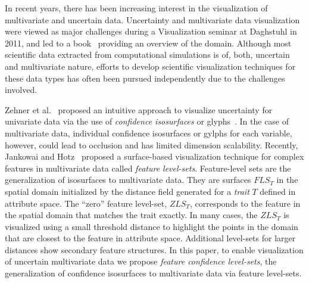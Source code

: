 In recent years, there has been increasing interest in the visualization of multivariate and uncertain data.
%
Uncertainty and multivariate data visualization were viewed as major challenges during a Visualization seminar at Daghstuhl in 2011, and led to a book~\cite{hansen2014scientific} providing an overview of the domain. 
%
Although most scientific data extracted from computational simulations is of, both, uncertain and multivariate nature, efforts to develop scientific visualization techniques for these data types has often been pursued independently due to the challenges involved.
%

Zehner et al.~\cite{zehner2010visualization} proposed an intuitive approach to visualize uncertainty for univariate data via the use of \textit{confidence isosurfaces} or glyphs~\cite{zehner2010visualization}.
%
In the case of multivariate data, individual confidence isosurfaces or gylphs for each variable, however, could lead to occlusion and has limited dimension scalability.
%
Recently, Jankowai and Hotz~\cite{jankowai2020feature} proposed a surface-based visualization technique for complex features in multivariate data called \textit{feature level-sets}. 
%
Feature-level sets are the generalization of isosurfaces to multivariate data.
%
They are surfaces $FLS_{T}$ in the spatial domain initialized by the distance field generated for a \textit{trait} $T$ defined in attribute space.
%
The ``zero'' feature level-set, $ZLS_{T}$, corresponds to the feature in the spatial domain that matches the trait exactly.
%
In many cases, the $ZLS_{T}$ is visualized using a small threshold distance to highlight the points in the domain that are closest to the feature in attribute space.
%
Additional level-sets for larger distances show secondary feature structures.
%
In this paper, to enable visualization of uncertain multivariate data we propose \textit{feature confidence level-sets}, the generalization of confidence isosurfaces to multivariate data via feature level-sets. 

